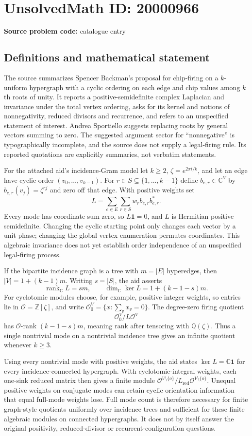 \documentclass[11pt]{article}
\newcommand{\Z}{\mathbb{Z}}
\newcommand{\Q}{\mathbb{Q}}
\newcommand{\C}{\mathbb{C}}
\begin{document}
\section*{UnsolvedMath ID: 20000966}
\textbf{Source problem code:} catalogue entry
\subsection{Definitions and mathematical statement}
The source summarizes Spencer Backman's proposal for chip-firing on a $k$-uniform hypergraph with a cyclic ordering on each edge and chip values among $k$th roots of unity. It reports a positive-semidefinite complex Laplacian and invariance under the total vertex ordering, asks for its kernel and notions of nonnegativity, reduced divisors and recurrence, and refers to an unspecified statement of interest. Andrea Sportiello suggests replacing roots by general vectors summing to zero. The suggested argument sector for ``nonnegative'' is typographically incomplete, and the source does not supply a legal-firing rule. Its reported quotations are explicitly summaries, not verbatim statements.

For the attached aid's incidence-Gram model let $k\ge2$, $\zeta=e^{2\pi i/k}$, and let an edge have cyclic order $(v_0,\ldots,v_{k-1})$. For $r\in S\subseteq\{1,\ldots,k-1\}$ define $b_{e,r}\in\C^V$ by $b_{e,r}(v_j)=\zeta^{rj}$ and zero off that edge. With positive weights set
\[
L=\sum_{e\in E}\sum_{r\in S}w_r b_{e,r}b_{e,r}^*.
\]
Every mode has coordinate sum zero, so $L\mathbf1=0$, and $L$ is Hermitian positive semidefinite. Changing the cyclic starting point only changes each vector by a unit phase; changing the global vertex enumeration permutes coordinates. This algebraic invariance does not yet establish order independence of an unspecified legal-firing process.

If the bipartite incidence graph is a tree with $m=|E|$ hyperedges, then $|V|=1+(k-1)m$. Writing $s=|S|$, the aid asserts
\[
\operatorname{rank}_{\C}L=sm,\qquad\dim_{\C}\ker L=1+(k-1-s)m.
\]
For cyclotomic modules choose, for example, positive integer weights, so entries lie in $\mathcal O=\Z[\zeta]$, and write $\mathcal O_0^V=\{x:\sum_vx_v=0\}$. The degree-zero firing quotient
\[
\mathcal O_0^V/L\mathcal O^V
\]
has $\mathcal O$-rank $(k-1-s)m$, meaning rank after tensoring with $\Q(\zeta)$. Thus a single nontrivial mode on a nontrivial incidence tree gives an infinite quotient whenever $k\ge3$.

Using every nontrivial mode with positive weights, the aid states $\ker L=\C\mathbf1$ for every incidence-connected hypergraph. With cyclotomic-integral weights, each one-sink reduced matrix then gives a finite module $\mathcal O^{V\setminus\{o\}}/L_{\mathrm{red}}\mathcal O^{V\setminus\{o\}}$. Unequal positive weights on conjugate modes can retain cyclic orientation information that equal full-mode weights lose. Full mode count is therefore necessary for finite graph-style quotients uniformly over incidence trees and sufficient for these finite algebraic modules on connected hypergraphs. It does not by itself answer the original positivity, reduced-divisor or recurrent-configuration questions.
\end{document}
